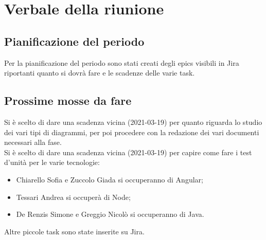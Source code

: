 \section{Verbale della riunione}

\subsection{Pianificazione del periodo}
Per la pianificazione del periodo sono stati creati degli epics visibili in Jira riportanti quanto si dovrà fare e le scadenze delle varie task.

\subsection{Prossime mosse da fare}
Si è scelto di dare una scadenza vicina (2021-03-19) per quanto riguarda lo studio dei vari tipi di diagrammi, per poi procedere con la redazione dei vari documenti necessari alla fase.\\
Si è scelto di dare una scadenza vicina (2021-03-19) per capire come fare i test d'unità per le varie tecnologie:
\begin{itemize}
	\item Chiarello Sofia e Zuccolo Giada si occuperanno di Angular;
	\item Tessari Andrea si occuperà di Node;
	\item De Renzis Simone e Greggio Nicolò si occuperanno di Java.
\end{itemize}
Altre piccole task sono state inserite su Jira.

